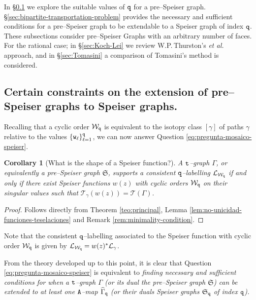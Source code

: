 \documentclass[final,3p,times]{elsarticle}
\newtheorem{corollary}[theorem]{Corollary}
\theoremstyle{definition}
\begin{document}
In \S\ref{sec:Certain-contrains} we explore the suitable values
of $\tt q$ for a pre--Speiser graph.
\S\ref{sec:bipartite-transportation-problem} provides the necessary and sufficient conditions for a pre--Speiser 
graph to be extendable to a Speiser graph of index $\tt q$. 
These subsections consider pre--Speiser Graphs with an arbitrary number of faces. 
For the rational case; in
\S\ref{sec:Koch-Lei} we review W.P.\,Thurston's \emph{et al.}  
approach, and in
\S \ref{sec:Tomasini} a comparison of Tomasini's method is considered.


\subsection{Certain constraints on the extension of pre--Speiser graphs to Speiser graphs.}
\label{sec:Certain-contrains}

Recalling that a cyclic order
$\mathcal{W}_{\tt q}$ is 
equivalent to the isotopy class $[\gamma]$
of paths $\gamma$ relative to the values $\{ {\tt w}_\ell \}_{\ell=1}^{\tt q}$, 
we can now answer Question \eqref{eq:pregunta-mosaico-speiser}.

\begin{corollary}[What is the shape of a Speiser function?]
\label{cor:shape-of-Speiser-function}
A $\tt t$--graph $\Gamma$, or equivalently a pre--Speiser graph $\mathfrak{S}$, 
supports a consistent $\tt q$--labelling $\mathcal{L}_{\mathcal{W}_{\tt q}}$
if and only if 
there exist Speiser functions $w(z)$ with
cyclic orders $\mathcal{W}_{\tt q}$ on their singular values such that 
$\mathscr{T}_\gamma(w(z))=\mathscr{T}(\Gamma)$.
\end{corollary}

\begin{proof}
Follows directly from Theorem \ref{teo:principal}, Lemma 
\ref{lem:no-unicidad-funciones-teselaciones} and Remark \ref{rem:minimality-condition}.
\end{proof}
Note that the consistent $\tt q$--labelling associated to the Speiser function with 
cyclic order $\mathcal{W}_{\tt q}$ is given by 
$\mathcal{L}_{\mathcal{W}_{\tt q}} = w(z)^*\mathcal{L}_\gamma$.

\noindent
From the theory developed up to this point, it is clear that
Question \eqref{eq:pregunta-mosaico-speiser}
is equivalent to 
\emph{finding necessary and sufficient conditions for 
when a $\tt t$--graph $\Gamma$ 
(or its dual the pre--Speiser graph $\mathfrak{S}$)
can be extended to 
at least one 
$\tt A$--map $\widehat{\Gamma}_{\tt q}$
(or their duals Speiser graphs $\mathfrak{S}_{\tt q}$ of 
index $\tt q$).}
 
\end{document}
